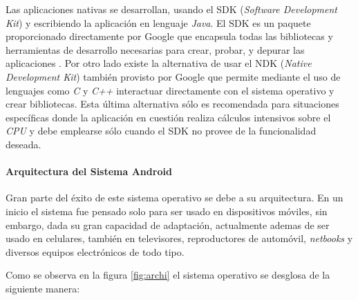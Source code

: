 Las aplicaciones nativas se desarrollan, usando el SDK (\textit{Software Development Kit}) y escribiendo la aplicación en lenguaje \textit{Java}. El SDK es un paquete proporcionado directamente por Google que encapsula todas las bibliotecas y herramientas de desarrollo necesarias para crear, probar, y depurar las aplicaciones \cite{ASDK}. Por otro lado existe la alternativa de usar el NDK (\textit{Native Development Kit}) también provisto por Google que permite mediante el uso de lenguajes como \textit{C} y \textit{C++} interactuar directamente con el sistema operativo y crear bibliotecas. Esta última alternativa sólo es recomendada para situaciones específicas donde la aplicación en cuestión realiza cálculos intensivos sobre el \textit{CPU} y debe emplearse sólo cuando el SDK no provee de la funcionalidad deseada\cite{ANDK}.

\paragraph{Arquitectura del Sistema Android}\mbox{}

Gran parte del éxito de este sistema operativo se debe a su arquitectura. En un inicio el sistema fue pensado solo para ser usado en dispositivos móviles, sin embargo, dada su gran capacidad de adaptación, actualmente ademas de ser usado en celulares, también en televisores, reproductores de automóvil, \textit{netbooks} y diversos equipos electrónicos de todo tipo.

Como se observa en la figura \ref{fig:archi} el sistema operativo se desglosa de la siguiente manera:

